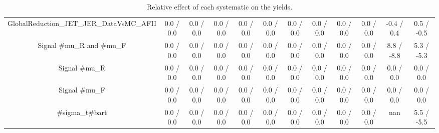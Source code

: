 \begin{table}[htbp]
\begin{center}
\begin{tabular}{|c|c|c|c|c|c|c|c|c|c|c|c|}
  GlobalReduction_JET_JER_DataVsMC_AFII & 0.0 / 0.0 & 0.0 / 0.0 & 0.0 / 0.0 & 0.0 / 0.0 & 0.0 / 0.0 & 0.0 / 0.0 & 0.0 / 0.0 & 0.0 / 0.0 & 0.0 / 0.0 & -0.4 / 0.4 & 0.5 / -0.5 \\ 
  Signal #mu_{R} and #mu_{F} & 0.0 / 0.0 & 0.0 / 0.0 & 0.0 / 0.0 & 0.0 / 0.0 & 0.0 / 0.0 & 0.0 / 0.0 & 0.0 / 0.0 & 0.0 / 0.0 & 0.0 / 0.0 & 8.8 / -8.8 & 5.3 / -5.3 \\ 
  Signal #mu_{R} & 0.0 / 0.0 & 0.0 / 0.0 & 0.0 / 0.0 & 0.0 / 0.0 & 0.0 / 0.0 & 0.0 / 0.0 & 0.0 / 0.0 & 0.0 / 0.0 & 0.0 / 0.0 & 0.0 / 0.0 & 0.0 / 0.0 \\ 
  Signal #mu_{F} & 0.0 / 0.0 & 0.0 / 0.0 & 0.0 / 0.0 & 0.0 / 0.0 & 0.0 / 0.0 & 0.0 / 0.0 & 0.0 / 0.0 & 0.0 / 0.0 & 0.0 / 0.0 & 0.0 / 0.0 & 0.0 / 0.0 \\ 
  #sigma_{t#bar{t}} & 0.0 / 0.0 & 0.0 / 0.0 & 0.0 / 0.0 & 0.0 / 0.0 & 0.0 / 0.0 & 0.0 / 0.0 & 0.0 / 0.0 & 0.0 / 0.0 & 0.0 / 0.0 &    nan    & 5.5 / -5.5 \\ 
\hline 
\end{tabular} 
\caption{Relative effect of each systematic on the yields.} 
\end{center} 
\end{table} 
